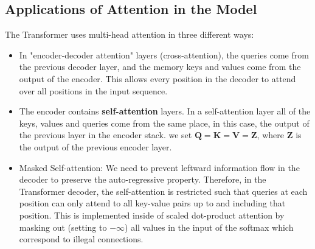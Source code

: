 \subsection{Applications of Attention in the Model}
The Transformer uses multi-head attention in three different ways:
\begin{itemize}
    \item In "encoder-decoder attention" layers (cross-attention), the queries come from the previous decoder layer, and the memory keys and values come from the output of the encoder. This allows every position in the decoder to attend over all positions in the input sequence. 

    \item The encoder contains \textbf{self-attention} layers. In a self-attention layer all of the keys, values and queries come from the same place, in this case, the output of the previous layer in the encoder stack. we set $\textbf{Q} = \textbf{K} = \textbf{V} = \textbf{Z}$, where $\textbf{Z}$ is the output of the previous encoder layer.

    \item Masked Self-attention: We need to prevent leftward information flow in the decoder to preserve the auto-regressive property. Therefore, in the Transformer decoder, the self-attention is restricted such that queries at each position can only attend to all key-value pairs up to and including that position. This is implemented inside of scaled dot-product attention by masking out (setting to $-\infty$) all values in the input of the softmax which correspond to illegal connections.
\end{itemize}

